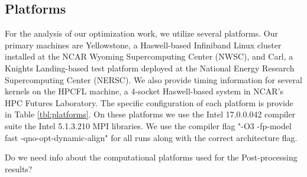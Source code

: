 \subsection{Platforms}

For the analysis of our optimization work,  we utilize several platforms.  Our primary machines are Yellowstone, a Haswell-based Infiniband Linux cluster installed at the NCAR Wyoming Supercomputing Center (NWSC), and Carl,  a Knights Landing-based test platform deployed at the National Energy Research Supercomputing Center (NERSC).  
We also provide timing information for several kernels on the HPCFL machine, a 4-socket Haswell-based system in NCAR's HPC Futures Laboratory.  The specific configuration of each platform is provide in Table \ref{tbl:platforms}.  On these platforms we use the Intel 17.0.0.042 compiler suite the Intel 5.1.3.210 MPI libraries.  We use the compiler flag "-O3 -fp-model fast -qno-opt-dynamic-align" for all runs along with the correct architecture flag.  

{\color{red} Do we need info about the computational platforms used for the Post-processing results?}  


